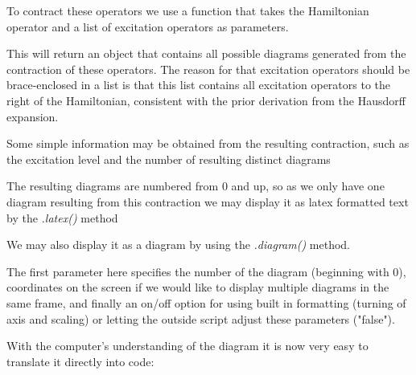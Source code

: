 To contract these operators we use a function that takes the
Hamiltonian operator and a list of excitation operators as parameters.

\begin{minipage}{\linewidth}
\end{minipage}

This will return an object that contains all possible diagrams
generated from the contraction of these operators. The reason for that
excitation operators should be brace-enclosed in a list is that this
list contains all excitation operators to the right of the
Hamiltonian, consistent with the prior derivation from the Hausdorff
expansion.

Some simple information may be obtained from the resulting contraction, such as the excitation level and the number of resulting distinct diagrams

\begin{minipage}{\linewidth}
\end{minipage}

The resulting diagrams are numbered from 0 and up, so as we only have one diagram resulting from this contraction we may display it as latex formatted text by the \emph{.latex()} method

\begin{minipage}{\linewidth}
\end{minipage}

We may also display it as a diagram by using the \emph{.diagram()} method.

\begin{minipage}{\linewidth}
\end{minipage}

The first parameter here specifies the number of the diagram
(beginning with 0), coordinates on the screen if we would like to
display multiple diagrams in the same frame, and finally an on/off
option for using built in formatting (turning of axis and scaling) or
letting the outside script adjust these parameters ("false").

With the computer's understanding of the diagram it is now very easy to translate it directly into code:

\begin{minipage}{\linewidth}
\end{minipage}


